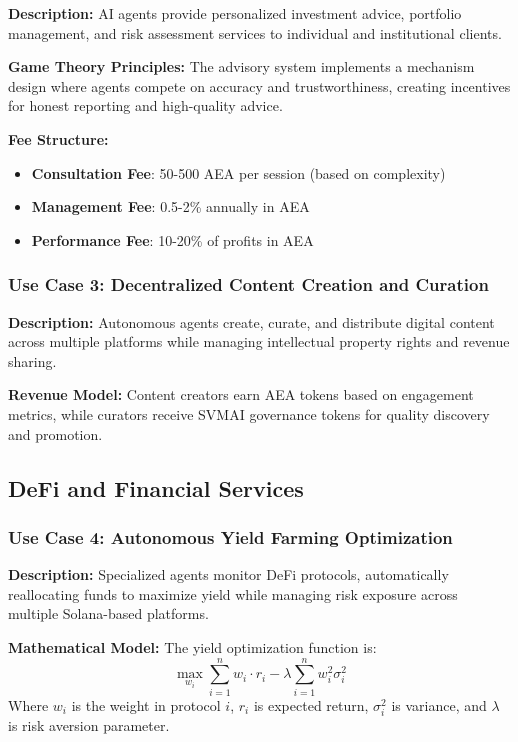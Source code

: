\documentclass[12pt,a4paper]{article}
\begin{document}
\textbf{Description:} AI agents provide personalized investment advice, portfolio management, and risk assessment services to individual and institutional clients.

\textbf{Game Theory Principles:}
The advisory system implements a mechanism design where agents compete on accuracy and trustworthiness, creating incentives for honest reporting and high-quality advice.

\textbf{Fee Structure:}
\begin{itemize}
\item \textbf{Consultation Fee}: 50-500 AEA per session (based on complexity)
\item \textbf{Management Fee}: 0.5-2\% annually in AEA
\item \textbf{Performance Fee}: 10-20\% of profits in AEA
\end{itemize}

\subsubsection{Use Case 3: Decentralized Content Creation and Curation}

\textbf{Description:} Autonomous agents create, curate, and distribute digital content across multiple platforms while managing intellectual property rights and revenue sharing.

\textbf{Revenue Model:}
Content creators earn AEA tokens based on engagement metrics, while curators receive SVMAI governance tokens for quality discovery and promotion.

\subsection{DeFi and Financial Services}

\subsubsection{Use Case 4: Autonomous Yield Farming Optimization}

\textbf{Description:} Specialized agents monitor DeFi protocols, automatically reallocating funds to maximize yield while managing risk exposure across multiple Solana-based platforms.

\textbf{Mathematical Model:}
The yield optimization function is:
$$\max_{w_i} \sum_{i=1}^n w_i \cdot r_i - \lambda \sum_{i=1}^n w_i^2 \sigma_i^2$$
Where $w_i$ is the weight in protocol $i$, $r_i$ is expected return, $\sigma_i^2$ is variance, and $\lambda$ is risk aversion parameter.
\end{document}
